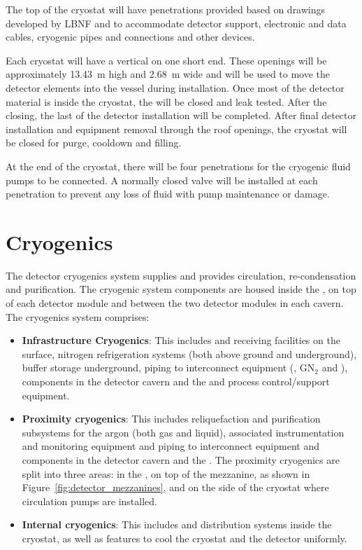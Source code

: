 The top of the cryostat will have penetrations provided based on
drawings developed by LBNF and  to accommodate detector support,
electronic and data cables, cryogenic pipes and connections and other
devices.

Each cryostat will have a vertical  on one short end.
These openings will be approximately \SI{13.43}{\meter} high and
\SI{2.68}{\meter} wide and will be used to move the detector elements
into the vessel during installation.  Once most of the detector
material is inside the cryostat, the  will be closed and
leak tested.  After the  closing, the last of the detector
installation will be completed. After final detector installation and
equipment removal through the roof openings, the cryostat will be
closed for purge, cooldown and filling.

At the  end of the cryostat, there will be four penetrations for
the cryogenic fluid pumps to be connected.  A normally closed valve
will be installed at each penetration to prevent any loss of fluid
with pump maintenance or damage.

\section{Cryogenics}
\label{sec:fdsp-coord-cryogenics}


The detector cryogenics system supplies  and provides
circulation, re-condensation and purification. The cryogenic system
components are housed inside the , on top of each detector module
and between the two detector modules in each cavern. The cryogenics system comprises:
\begin{itemize}
\item {\bf Infrastructure Cryogenics}: This includes  and  receiving
  facilities on the surface, nitrogen refrigeration systems (both
  above ground and underground),  buffer storage
  underground, piping to interconnect equipment (, GN$_2$ and ),
  components in the detector cavern and the  and process control/support
  equipment.
\item {\bf Proximity cryogenics}: This includes reliquefaction 
  and purification subsystems for the argon (both gas and liquid), associated
  instrumentation and monitoring equipment and  piping to
  interconnect equipment and components in the detector cavern and the
  . The proximity cryogenics are split into three areas: in the
  , on top of the mezzanine, as shown in Figure~\ref{fig:detector_mezzanines},
  and on the side of the cryostat where  circulation pumps are installed.
\item {\bf Internal cryogenics}: This includes  and  distribution
  systems inside the cryostat, as well as features to cool the
  cryostat and the detector uniformly.
\end{itemize}

